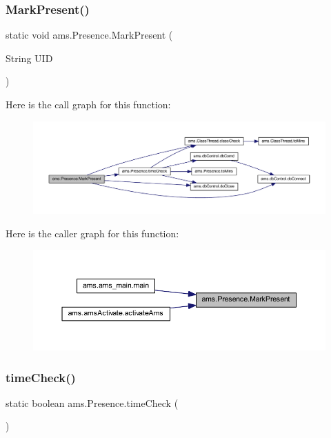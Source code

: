 \subsubsection{\texorpdfstring{MarkPresent()}{MarkPresent()}}
{\footnotesize\ttfamily static void ams.\+Presence.\+Mark\+Present (\begin{DoxyParamCaption}\item[{String}]{U\+ID }\end{DoxyParamCaption})\hspace{0.3cm}{\ttfamily [static]}}

Here is the call graph for this function\+:\nopagebreak
\begin{figure}[H]
\begin{center}
\leavevmode
\includegraphics[width=350pt]{classams_1_1_presence_a6f7a875d8decb48536c8eb9a6ef8d3d2_cgraph}
\end{center}
\end{figure}
Here is the caller graph for this function\+:\nopagebreak
\begin{figure}[H]
\begin{center}
\leavevmode
\includegraphics[width=350pt]{classams_1_1_presence_a6f7a875d8decb48536c8eb9a6ef8d3d2_icgraph}
\end{center}
\end{figure}
\mbox{\label{classams_1_1_presence_af021bed37055300b60e76853f4bc0666}} 
\subsubsection{\texorpdfstring{timeCheck()}{timeCheck()}}
{\footnotesize\ttfamily static boolean ams.\+Presence.\+time\+Check (\begin{DoxyParamCaption}{ }\end{DoxyParamCaption})\hspace{0.3cm}{\ttfamily [static]}}

